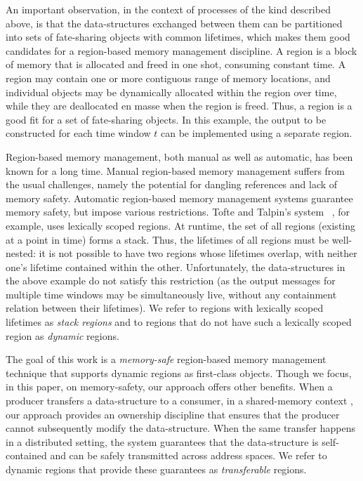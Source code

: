 
An important observation, in the context of processes of the kind
described above, is that the data-structures exchanged between them
can be partitioned into sets of fate-sharing objects with common
lifetimes, which makes them good candidates for a region-based memory
management discipline. A region is a block of memory that is allocated
and freed in one shot, consuming constant time. A region may contain
one or more contiguous range of memory locations, and individual
objects may be dynamically allocated within the region over time,
while they are deallocated en masse when the region is freed.  Thus, a
region is a good fit for a set of fate-sharing objects.
In this example, the output to be constructed for each time window $t$
can be implemented using a separate region.

Region-based memory management, both manual as well as automatic, has
been known for a long time. Manual region-based memory management
suffers from the usual challenges, namely the potential for dangling
references and lack of memory safety. Automatic region-based memory
management systems guarantee memory safety, but impose various
restrictions.  Tofte and Talpin's system~\cite{tofte94,tofte97} , for
example, uses lexically scoped regions.  At runtime, the set of all
regions (existing at a point in time) forms a stack. Thus, the
lifetimes of all regions must be well-nested: it is not possible to
have two regions whose lifetimes overlap, with neither one's lifetime
contained within the other.  Unfortunately, the data-structures in the
above example do not satisfy this restriction (as the output messages
for multiple time windows may be simultaneously live, without any
containment relation between their lifetimes).  We refer to regions
with lexically scoped lifetimes as \emph{stack regions} and to regions
that do not have such a lexically scoped region as \emph{dynamic}
regions.

The goal of this work is a \emph{memory-safe} region-based memory
management technique that supports dynamic regions as first-class
objects. Though we focus, in this paper, on memory-safety, our
approach offers other benefits.  When a producer transfers a
data-structure to a consumer, in a shared-memory context , our
approach provides an ownership discipline that ensures that the
producer cannot subsequently modify the data-structure. When the same
transfer happens in a distributed setting, the system guarantees that
the data-structure is self-contained and can be safely transmitted
across address spaces.  We refer to dynamic regions that provide these
guarantees as \emph{transferable} regions.

